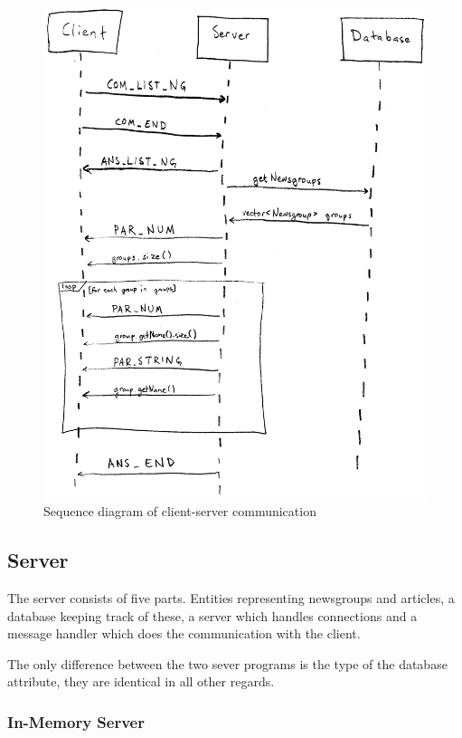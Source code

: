 \documentclass[a4paper]{article}
\begin{document}
\begin{figure}
    \centering
    \includegraphics[width=1\textwidth]{sequml}
    \caption{Sequence diagram of client-server communication}
    \label{sequml}
\end{figure}

\subsection{Server}

The server consists of five parts. Entities representing newsgroups and articles, a database keeping track of these, a server which handles connections and a message handler which does the communication with the client.

The only difference between the two sever programs is the type of the database attribute, they are identical in all other regards.

\subsubsection{In-Memory Server}
\end{document}
